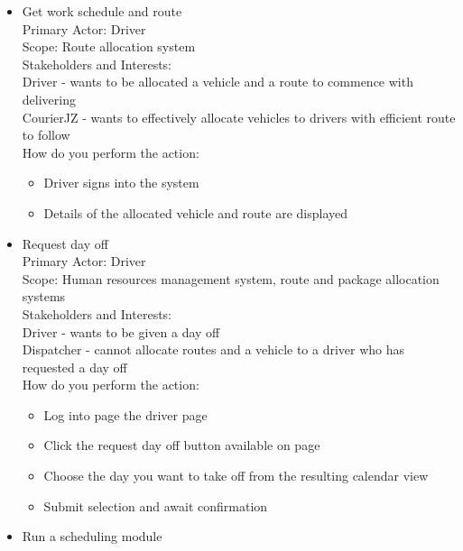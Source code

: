 \documentclass[paper=a4, fontsize=11pt]{scrartcl} %
\numberwithin{equation}{section} %
\numberwithin{figure}{section} %
\numberwithin{table}{section} %
\begin{document}
\begin{itemize}
\begin{itemize}
\end{itemize}


\item Get work schedule and route\\

Primary Actor: \quad \quad Driver \\
Scope:		\quad \quad	 Route allocation system \\
Stakeholders and Interests: \\
Driver - wants to be allocated a vehicle and a route to commence with delivering \\
CourierJZ - wants to effectively allocate vehicles to drivers with efficient route to follow \\
How do you perform the action: \\
\begin{itemize}
\item Driver signs into the system
\item Details of the allocated vehicle and route are displayed 
\end{itemize}

\item Request day off\\

Primary Actor: \quad \quad Driver \\
Scope:		\quad \quad	Human resources management system, route and package allocation systems  \\
Stakeholders and Interests: \\
Driver - wants to be given a day off \\
Dispatcher - cannot allocate routes and a vehicle to a driver who has requested a day off \\
How do you perform the action: \\
\begin{itemize}
\item Log into page the driver page
\item Click the request day off button available on page
\item Choose the day you want to take off from the resulting calendar view
\item Submit selection and await confirmation 
\end{itemize}

\item Run a scheduling module\\


\end{itemize}
\end{document}
